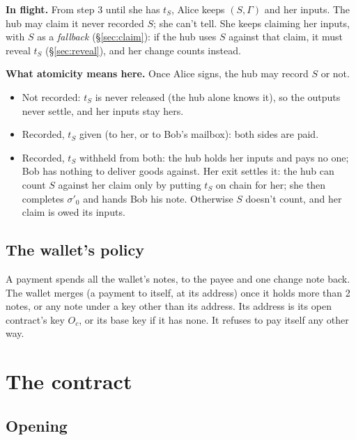 \documentclass[11pt]{article}
\theoremstyle{plain}
\theoremstyle{definition}
\newcommand{\Oc}{O_c}
\begin{document}
\textbf{In flight.} From step 3 until she has $t_S$, Alice keeps $(S,
\Gamma)$ and her inputs. The hub may claim it never recorded $S$; she
can't tell. She keeps claiming her inputs, with $S$ as a \emph{fallback}
(\S\ref{sec:claim}): if the hub uses $S$ against that claim, it must
reveal $t_S$ (\S\ref{sec:reveal}), and her change counts instead.

\textbf{What atomicity means here.} Once Alice signs, the hub may record
$S$ or not.
\begin{itemize}[nosep]
\item Not recorded: $t_S$ is never released (the hub alone knows it), so
  the outputs never settle, and her inputs stay hers.
\item Recorded, $t_S$ given (to her, or to Bob's mailbox): both sides
  are paid.
\item Recorded, $t_S$ withheld from both: the hub holds her inputs and
  pays no one; Bob has nothing to deliver goods against. Her exit
  settles it: the hub can count $S$ against her claim only by putting
  $t_S$ on chain for her; she then completes $\sigma'_0$ and hands Bob
  his note. Otherwise $S$ doesn't count, and her claim is owed its
  inputs.
\end{itemize}

\subsection{The wallet's policy}

A payment spends all the wallet's notes, to the payee and one change
note back. The wallet merges (a payment to itself, at its address) once
it holds more than 2 notes, or any note under a key other than its
address. Its address is its open contract's key $\Oc$, or its base key
if it has none. It refuses to pay itself any other way.

\section{The contract}

\subsection{Opening}\label{sec:opening}
\end{document}
